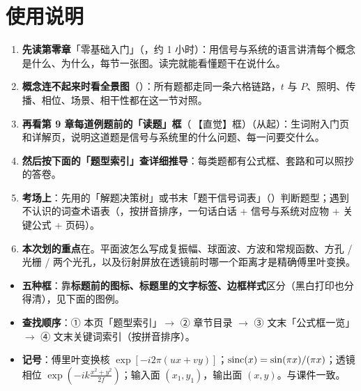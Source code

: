 \chapter*{使用说明}
\begin{idea}
\begin{enumerate}
\item \textbf{先读第零章}「零基础入门」（\pageref{ch:primer}，约 1 小时）：用信号与系统的语言讲清每个概念是什么、为什么，每节一张图。读完就能看懂题干在说什么。
\item \textbf{概念连不起来时看全景图}（\pageref{sec:p-whole}）：所有题都走同一条六格链路，$t$ 与 $P$、照明、传播、相位、场景、相干性都在这一节对照。
\item \textbf{再看第 9 章每道例题前的「读题」框}（\icoI\,【直觉】框）（从\pageref{rd:v-mtf}起）：生词附入门页和详解页，说明这道题是信号与系统里的什么问题、每一问要交什么。
\item \textbf{然后按下面的「题型索引」查详细推导}：每类题都有公式框、套路和可以照抄的答卷。
\item \textbf{考场上}：先用\pageref{fig:dectree}的「解题决策树」或书末「题干信号词表」（\pageref{tab:signal}）判断题型；遇到不认识的词查术语表（\pageref{tab:glossary}，按拼音排序，一句话白话 + 信号与系统对应物 + 关键公式 + 页码）。
\item \textbf{本次划的重点}在\pageref{sec:kaodian}。平面波怎么写成复振幅、球面波、方波和常规函数、方孔 / 光栅 / 两个光孔，以及衍射屏放在透镜前时哪一个距离才是精确傅里叶变换。
\end{enumerate}
\end{idea}
\begin{itemize}
\item \textbf{五种框}：靠\textbf{标题前的图标、标题里的文字标签、边框样式}区分（黑白打印也分得清），见下面的图例。
\item \textbf{查找顺序}：① 本页「题型索引」$\to$ ② 章节目录 $\to$ ③ 文末「公式框一览」$\to$ ④ 文末关键词索引（按拼音排序）。
\item \textbf{记号}：傅里叶变换核 $\exp[-i2\pi(ux+vy)]$；$\operatorname{sinc}(x)=\sin(\pi x)/(\pi x)$；透镜相位 $\exp\!\left(-ik\frac{x^2+y^2}{2f}\right)$；输入面 $(x_1,y_1)$，输出面 $(x,y)$。与课件一致。
\end{itemize}



